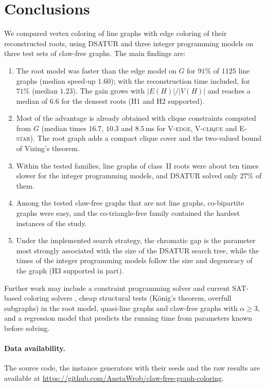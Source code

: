 \documentclass[11pt,a4paper]{article}
\newcommand{\Vedge}{\textsc{V-edge}}
\newcommand{\Vclique}{\textsc{V-clique}}
\newcommand{\Estar}{\textsc{E-star}}
\begin{document}
\section{Conclusions}

We compared vertex coloring of line graphs with edge coloring of their
reconstructed roots, using DSATUR and three integer programming models on
three test sets of claw-free graphs. The main findings are:
\begin{enumerate}\setlength{\itemsep}{1pt}
\item The root model was faster than the edge model on $G$ for $91\%$ of
$1125$ line graphs (median speed-up $1.60$); with the reconstruction time
included, for $71\%$ (median $1.23$). The gain grows with $|E(H)|/|V(H)|$ and
reaches a median of $6.6$ for the densest roots (H1 and H2 supported).
\item Most of the advantage is already obtained with clique constraints
computed from $G$ (median times $16.7$, $10.3$ and $8.5$\,ms for \Vedge,
\Vclique{} and \Estar). The root graph adds a compact clique cover and the
two-valued bound of Vizing's theorem.
\item Within the tested families, line graphs of class~II roots were about ten
times slower for the integer programming models, and DSATUR solved only $27\%$
of them.
\item Among the tested claw-free graphs that are not line graphs, co-bipartite
graphs were easy, and the co-triangle-free family contained the hardest
instances of the study.
\item Under the implemented search strategy, the chromatic gap is the
parameter most strongly associated with the size of the DSATUR search tree,
while the times of the integer programming models follow the size and
degeneracy of the graph (H3 supported in part).
\end{enumerate}
Further work may include a constraint programming solver and current
SAT-based coloring solvers \cite{heule2022,faber2024}, cheap structural tests
(K\"onig's theorem, overfull subgraphs) in the root model, quasi-line graphs and
claw-free graphs with $\alpha\ge 3$, and a regression model that predicts the
running time from parameters known before solving.

\paragraph{Data availability.}
The source code, the instance generators with their seeds and the raw results
are available at \url{https://github.com/AnetaWrob/claw-free-graph-coloring}.

{\footnotesize
\setlength{\bibsep}{1pt}


}
\end{document}
